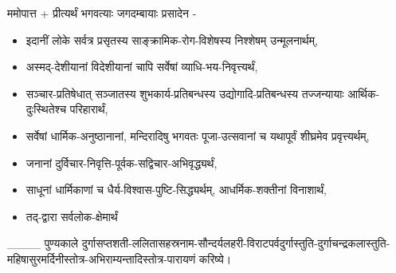 \setcounter{page}{0}
\sectionmark{\mbox{}}
\renewcommand{\chaptermark}[1]{%
\markboth{\large #1}{}}
\begin{center}

ममोपात्त + प्रीत्यर्थं भगवत्याः जगदम्बायाः प्रसादेन -
\begin{itemize}\addtolength{\itemsep}{-1ex}
\item इदानीं लोके सर्वत्र प्रसृतस्य साङ्क्रामिक-रोग-विशेषस्य निश्शेषम् उन्मूलनार्थम्,
\item अस्मद्-देशीयानां विदेशीयानां चापि सर्वेषां व्याधि-भय-निवृत्त्यर्थं,
\item सञ्चार-प्रतिषेधात् सञ्जातस्य शुभकार्य-प्रतिबन्धस्य उद्योगादि-प्रतिबन्धस्य तज्जन्यायाः आर्थिक-दुःस्थितेश्च  परिहारार्थं,
\item सर्वेषां धार्मिक-अनुष्ठानानां, मन्दिरादिषु भगवतः पूजा-उत्सवानां च यथापूर्वं शीघ्रमेव प्रवृत्त्यर्थम्,
\item जनानां दुर्विचार-निवृत्ति-पूर्वक-सद्विचार-अभिवृद्ध्यर्थं,
\item साधूनां धार्मिकाणां च धैर्य-विश्वास-पुष्टि-सिद्ध्यर्थम्, आधर्मिक-शक्तीनां विनाशार्थं,
\item तद्-द्वारा सर्वलोक-क्षेमार्थं
\end{itemize}
\_\_\_\_ पुण्यकाले 
दुर्गासप्तशती-ललितासहस्रनाम-सौन्दर्यलहरी-विराटपर्वदुर्गास्तुति-दुर्गाचन्द्रकलास्तुति-महिषासुरमर्दिनीस्तोत्र-अभिराम्यन्तादिस्तोत्र-पारायणं करिष्ये।













\closesection
\end{center}

